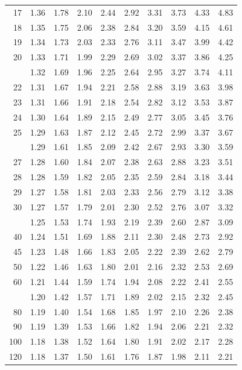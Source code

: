 \documentclass[10pt]{article}
\begin{document}
\begin{longtable}{@{}r!{\vrule width 0.8pt\hspace{0.55em}}rrrrrrrrr@{}}
17 & 1.36 & 1.78 & 2.10 & 2.44 & 2.92 & 3.31 & 3.73 & 4.33 & 4.83 \\
18 & 1.35 & 1.75 & 2.06 & 2.38 & 2.84 & 3.20 & 3.59 & 4.15 & 4.61 \\
19 & 1.34 & 1.73 & 2.03 & 2.33 & 2.76 & 3.11 & 3.47 & 3.99 & 4.42 \\
20 & 1.33 & 1.71 & 1.99 & 2.29 & 2.69 & 3.02 & 3.37 & 3.86 & 4.25 \\
 & 1.32 & 1.69 & 1.96 & 2.25 & 2.64 & 2.95 & 3.27 & 3.74 & 4.11 \\
22 & 1.31 & 1.67 & 1.94 & 2.21 & 2.58 & 2.88 & 3.19 & 3.63 & 3.98 \\
23 & 1.31 & 1.66 & 1.91 & 2.18 & 2.54 & 2.82 & 3.12 & 3.53 & 3.87 \\
24 & 1.30 & 1.64 & 1.89 & 2.15 & 2.49 & 2.77 & 3.05 & 3.45 & 3.76 \\
25 & 1.29 & 1.63 & 1.87 & 2.12 & 2.45 & 2.72 & 2.99 & 3.37 & 3.67 \\
 & 1.29 & 1.61 & 1.85 & 2.09 & 2.42 & 2.67 & 2.93 & 3.30 & 3.59 \\
27 & 1.28 & 1.60 & 1.84 & 2.07 & 2.38 & 2.63 & 2.88 & 3.23 & 3.51 \\
28 & 1.28 & 1.59 & 1.82 & 2.05 & 2.35 & 2.59 & 2.84 & 3.18 & 3.44 \\
29 & 1.27 & 1.58 & 1.81 & 2.03 & 2.33 & 2.56 & 2.79 & 3.12 & 3.38 \\
30 & 1.27 & 1.57 & 1.79 & 2.01 & 2.30 & 2.52 & 2.76 & 3.07 & 3.32 \\
 & 1.25 & 1.53 & 1.74 & 1.93 & 2.19 & 2.39 & 2.60 & 2.87 & 3.09 \\
40 & 1.24 & 1.51 & 1.69 & 1.88 & 2.11 & 2.30 & 2.48 & 2.73 & 2.92 \\
45 & 1.23 & 1.48 & 1.66 & 1.83 & 2.05 & 2.22 & 2.39 & 2.62 & 2.79 \\
50 & 1.22 & 1.46 & 1.63 & 1.80 & 2.01 & 2.16 & 2.32 & 2.53 & 2.69 \\
60 & 1.21 & 1.44 & 1.59 & 1.74 & 1.94 & 2.08 & 2.22 & 2.41 & 2.55 \\
 & 1.20 & 1.42 & 1.57 & 1.71 & 1.89 & 2.02 & 2.15 & 2.32 & 2.45 \\
80 & 1.19 & 1.40 & 1.54 & 1.68 & 1.85 & 1.97 & 2.10 & 2.26 & 2.38 \\
90 & 1.19 & 1.39 & 1.53 & 1.66 & 1.82 & 1.94 & 2.06 & 2.21 & 2.32 \\
100 & 1.18 & 1.38 & 1.52 & 1.64 & 1.80 & 1.91 & 2.02 & 2.17 & 2.28 \\
120 & 1.18 & 1.37 & 1.50 & 1.61 & 1.76 & 1.87 & 1.98 & 2.11 & 2.21 \\

\end{longtable}
\end{document}
